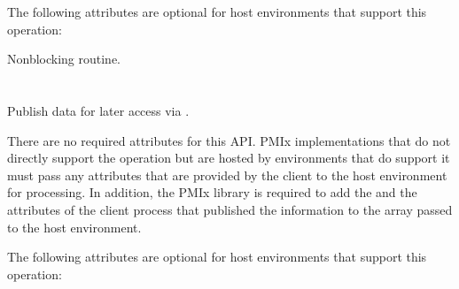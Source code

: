 \optattrstart
The following attributes are optional for host environments that support this operation:


\optattrend

\descr

Nonblocking  routine.


\section{}

\summary

Publish data for later access via .

\format


\begin{arglist}
\end{arglist}

\returnsimple

\reqattrstart
There are no required attributes for this \ac{API}. \ac{PMIx} implementations that do not directly support the operation but are hosted by environments that do support it must pass any attributes that are provided by the client to the host environment for processing. In addition, the \ac{PMIx} library is required to add the  and the  attributes of the client process that published the information to the  array passed to the host environment.

\reqattrend

\optattrstart
The following attributes are optional for host environments that support this operation:


